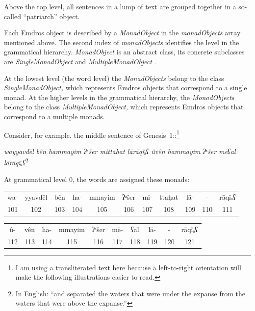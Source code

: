 \documentclass[11pt,oneside,a4paper]{memoir}
\newcommand*{\bibleref}[3]{#1~#2\thinspace:\thinspace#3}
\begin{document}
Above the top level, all sentences in a lump of text are grouped together in a so-called
``patriarch'' object.

Each Emdros object is described by a \emph{MonadObject} in the \emph{monadObjects} array mentioned
above. The second index of \emph{monadObjects} identifies the level in the grammatical hierarchy.
\emph{MonadObject} is an abstract class, its concrete subclasses are \emph{SingleMonadObject}%
and \emph{MultipleMonadObject}%
.

At the lowest level (the word level) the \emph{MonadObjects} belong to the class
\emph{SingleMonadObject,} which represents Emdros objects that correspond to a single monad. At the
higher levels in the grammatical hierarchy, the \emph{MonadObjects} belong to the class
\emph{MultipleMonadObject,} which represents Emdros objects that correspond to a multiple monads.

Consider, for example, the middle sentence of \bibleref{Genesis}{1}{7}:\footnote{I am using a transliterated text
  here because a left-to-right orientation will make the following illustrations easier to read.}

\begin{center}
\emph{wayyavdēl bên hammayim ʔ}ᵃ\emph{šer mittaḥat lārāqîₐʕ ûvên hammayim ʔ}ᵃ\emph{šer mēʕal lārāqîₐʕ}\thinspace\footnote{In English: ``and separated the waters that were under the expanse from the waters that were above
the expanse.''}
\end{center}

\Needspace*{5cm}%
At grammatical level 0, the words are assigned these monads:

\begin{center}
\begin{shaded}
\begin{tabu}{@{}c|c|c|c|c|c|c|c|c|c|c@{}}
wa- & yyavdēl & bên & ha- & mmayim & ʔᵃšer & mi- & ttaḥat & lā- & - & rāqîₐʕ \\
101 & 102 & 103 & 104 & 105 & 106 & 107 & 108 & 109 & 110 & 111 \\
\end{tabu}

\vspace{5mm}

\begin{tabu}{@{}c|c|c|c|c|c|c|c|c|c@{}}
û- & vên & ha- & mmayim & ʔᵃšer & mē- & ʕal & lā- & - & rāqîₐʕ\\
112 & 113 & 114 & 115 & 116 & 117 & 118 & 119 & 120 & 121\\
\end{tabu}
\end{shaded}
\end{center}
\end{document}
